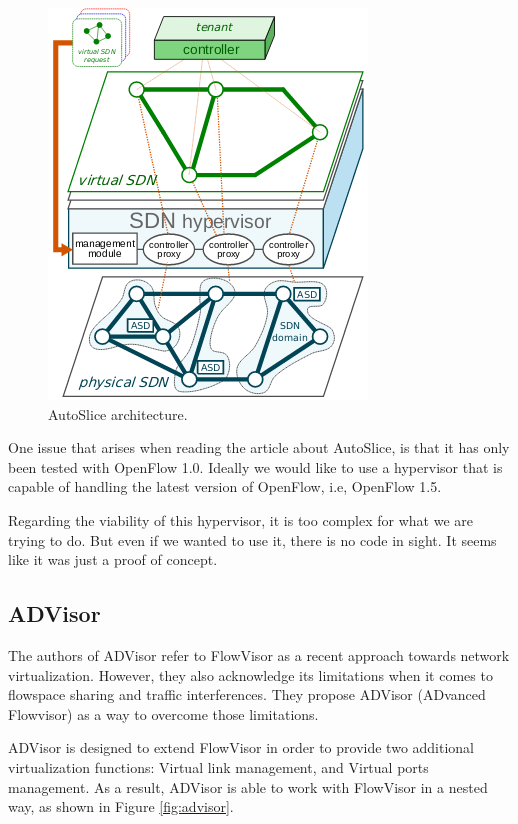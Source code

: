 \begin{figure}
  \centering
  \includegraphics[width=0.6\linewidth]{imagenes/StateOfTheArt/AutoSlice_architecture.png}
  \caption[AutoSlice architecture.]{AutoSlice architecture\cite{autoslice}.}
  \label{fig:autoslice}
\end{figure}

One issue that arises when reading the article about AutoSlice, is that it has only been tested with OpenFlow 1.0. Ideally we would like to use a hypervisor that is capable of handling the latest version of OpenFlow, i.e, OpenFlow 1.5.

Regarding the viability of this hypervisor, it is too complex for what we are trying to do. But even if we wanted to use it, there is no code in sight. It seems like it was just a proof of concept. 

\subsection{ADVisor}
The authors of ADVisor\cite{advisor} refer to FlowVisor as a recent approach towards network virtualization. However, they also acknowledge its limitations when it comes to flowspace sharing and traffic interferences. They propose ADVisor (ADvanced Flowvisor) as a way to overcome those limitations. 

ADVisor is designed to extend FlowVisor in order to provide two additional virtualization functions: Virtual link management, and Virtual ports management. As a result, ADVisor is able to work with FlowVisor in a nested way, as shown in Figure \ref{fig:advisor}.

